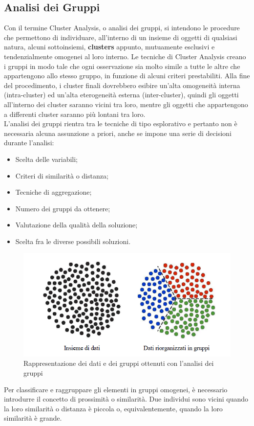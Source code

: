 \subsection{Analisi dei Gruppi}
Con il termine Cluster Analysis, o analisi dei gruppi, si intendono le procedure che permettono di individuare, all'interno di un insieme di oggetti di qualsiasi natura, alcuni sottoinsiemi, \textbf{clusters} appunto, mutuamente esclusivi e tendenzialmente omogenei al loro interno. Le tecniche di Cluster Analysis creano i gruppi in modo tale che ogni osservazione sia molto simile a tutte le altre che appartengono allo stesso gruppo, in funzione di alcuni criteri prestabiliti. Alla fine del procedimento, i cluster finali dovrebbero esibire un'alta omogeneità interna (intra-cluster) ed un'alta eterogeneità esterna (inter-cluster), quindi gli oggetti all'interno dei cluster saranno vicini tra loro, mentre gli oggetti che appartengono a differenti cluster saranno più lontani tra loro.\\
L'analisi dei gruppi rientra tra le tecniche di tipo esplorativo e pertanto non è necessaria alcuna assunzione a priori, anche se impone una serie di decisioni durante l'analisi:
\begin{itemize}
	\item Scelta delle variabili;
	\item Criteri di similarità o distanza;
	\item Tecniche di aggregazione;
	\item Numero dei gruppi da ottenere;
	\item Valutazione della qualità della soluzione;
	\item Scelta fra le diverse possibili soluzioni.
\end{itemize}
\begin{figure}[]
	\centering
	\includegraphics[scale=0.8]{images/Esempio_Cluster.png}
	\caption{Rappresentazione dei dati e dei gruppi ottenuti con l'analisi dei gruppi}
\end{figure}
Per classificare e raggruppare gli elementi in gruppi omogenei, è necessario introdurre il concetto di prossimità o similarità. Due individui sono vicini quando la loro similarità o distanza è piccola o, equivalentemente, quando la loro similarità è grande.

